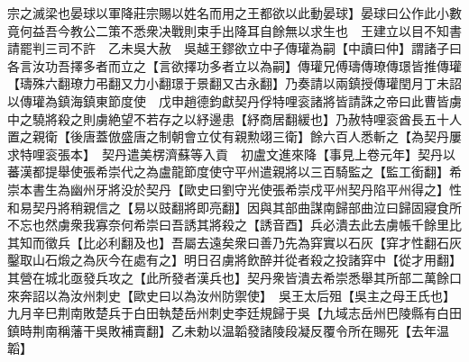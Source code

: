 宗之滅梁也晏球以軍降莊宗賜以姓名而用之王都欲以此動晏球】晏球曰公作此小數竟何益吾今教公二策不悉衆决戰則束手出降耳自餘無以求生也　王建立以目不知書請罷判三司不許　乙未吳大赦　吳越王鏐欲立中子傳瓘為嗣【中讀曰仲】謂諸子曰各言汝功吾擇多者而立之【言欲擇功多者立以為嗣】傳瓘兄傅璹傳璙傳璟皆推傳瓘【璹殊六翻璙力弔翻又力小翻璟于景翻又古永翻】乃奏請以兩鎮授傳瓘閏月丁未詔以傳瓘為鎮海鎮東節度使　戊申趙德鈞獻契丹俘特哩衮諸將皆請誅之帝曰此曹皆虜中之驍將殺之則虜絶望不若存之以紓邊患【紓商居翻緩也】乃赦特哩衮酋長五十人置之親衛【後唐蓋倣盛唐之制朝會立仗有親勲翊三衛】餘六百人悉斬之【為契丹屢求特哩衮張本】　契丹遣美楞濟蘇等入貢　初盧文進來降【事見上卷元年】契丹以蕃漢都提舉使張希崇代之為盧龍節度使守平州遣親將以三百騎監之【監工銜翻】希崇本書生為幽州牙將没於契丹【歐史曰劉守光使張希崇戍平州契丹陷平州得之】性和易契丹將稍親信之【易以豉翻將即亮翻】因與其部曲謀南歸部曲泣曰歸固寢食所不忘也然虜衆我寡奈何希崇曰吾誘其將殺之【誘音酉】兵必潰去此去虜帳千餘里比其知而徵兵【比必利翻及也】吾屬去遠矣衆曰善乃先為穽實以石灰【穽才性翻石灰鑿取山石煅之為灰今在處有之】明日召虜將飲醉并從者殺之投諸穽中【從才用翻】其營在城北亟發兵攻之【此所發者漢兵也】契丹衆皆潰去希崇悉舉其所部二萬餘口來奔詔以為汝州刺史【歐史曰以為汝州防禦使】　吳王太后殂【吳主之母王氏也】　九月辛巳荆南敗楚兵于白田執楚岳州刺史李廷規歸于吳【九域志岳州巴陵縣有白田鎮時荆南稱藩干吳敗補賣翻】乙未勅以温韜發諸陵段凝反覆令所在賜死【去年温韜】

